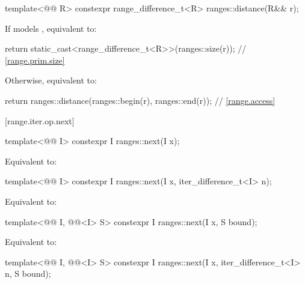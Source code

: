 %
\begin{itemdecl}
template<@@ R>
  constexpr range_difference_t<R> ranges::distance(R&& r);
\end{itemdecl}

\begin{itemdescr}
\pnum
\effects
If  models , equivalent to:
\begin{codeblock}
return static_cast<range_difference_t<R>>(ranges::size(r));     // \ref{range.prim.size}
\end{codeblock}
Otherwise, equivalent to:
\begin{codeblock}
return ranges::distance(ranges::begin(r), ranges::end(r));      // \ref{range.access}
\end{codeblock}
\end{itemdescr}

[range.iter.op.next]{}

%
\begin{itemdecl}
template<@@ I>
  constexpr I ranges::next(I x);
\end{itemdecl}

\begin{itemdescr}
\pnum
\effects
Equivalent to: 
\end{itemdescr}

%
\begin{itemdecl}
template<@@ I>
  constexpr I ranges::next(I x, iter_difference_t<I> n);
\end{itemdecl}

\begin{itemdescr}
\pnum
\effects
Equivalent to: 
\end{itemdescr}

%
\begin{itemdecl}
template<@@ I, @@<I> S>
  constexpr I ranges::next(I x, S bound);
\end{itemdecl}

\begin{itemdescr}
\pnum
\effects
Equivalent to: 
\end{itemdescr}

%
\begin{itemdecl}
template<@@ I, @@<I> S>
  constexpr I ranges::next(I x, iter_difference_t<I> n, S bound);
\end{itemdecl}

